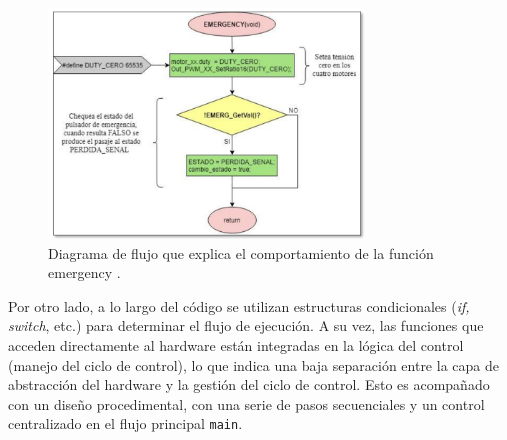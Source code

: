 \begin{figure}[h]
\caption{Diagrama de flujo que explica el comportamiento de la función emergency \cite[pág. 82]{disenioViejo1}.}
\label{diagra}
\begin{centering}
{\includegraphics[width=0.75\textwidth]{diagramaFlujo.png}\par}
\end{centering}
\end{figure}


Por otro lado, a lo largo del código se utilizan estructuras condicionales (\textit{if, switch}, etc.) para determinar el flujo de ejecución. A su vez, las funciones que acceden directamente al hardware están integradas en la lógica del control (manejo del ciclo de control), lo que indica una baja separación entre la capa de abstracción del hardware y la gestión del ciclo de control. Esto es acompañado con un diseño procedimental, con una serie de pasos secuenciales y un control centralizado en el flujo principal \verb|main|.

